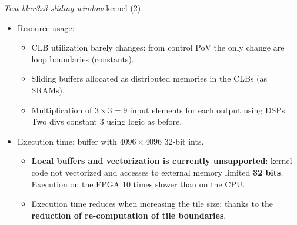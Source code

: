 \documentclass[8pt,a4paper,oneside,hidelinks,aspectratio=169,dvipsnames]{beamer}
\begin{document}
\begin{frame}{\textit{Test blur3x3 sliding window} kernel (2)}
  \begin{itemize}
    \item Resource usage:
          \begin{table}[Ht]
            \makebox[\linewidth]{
              \scalebox{.4}{}
              \scalebox{.4}{}
              \scalebox{.4}{}
              \scalebox{.4}{}
              \scalebox{.4}{}
            }
          \end{table}
          \begin{itemize}
            \item CLB utilization barely changes: from control PoV the only change are loop boundaries (constants).
            \item Sliding buffers allocated as distributed memories in the CLBs (as SRAMs).
            \item Multiplication of $3\times 3 = 9$ input elements for each output using DSPs. Two divs constant $3$ using logic as before.
          \end{itemize}
    \item Execution time: buffer with $4096 \times 4096$ 32-bit ints.
          \begin{table}[H]
            \centering
            \scalebox{.333}{}
          \end{table}
          \begin{itemize}
            \item \textbf{Local buffers and vectorization is currently unsupported}: kernel code not vectorized and accesses to external memory limited \textbf{32 bits}. Execution on the FPGA 10 times slower than on the CPU.
            \item Execution time reduces when increasing the tile size: thanks to the \textbf{reduction of re-computation of tile boundaries}.
          \end{itemize}
  \end{itemize}
\end{frame}
\end{document}
